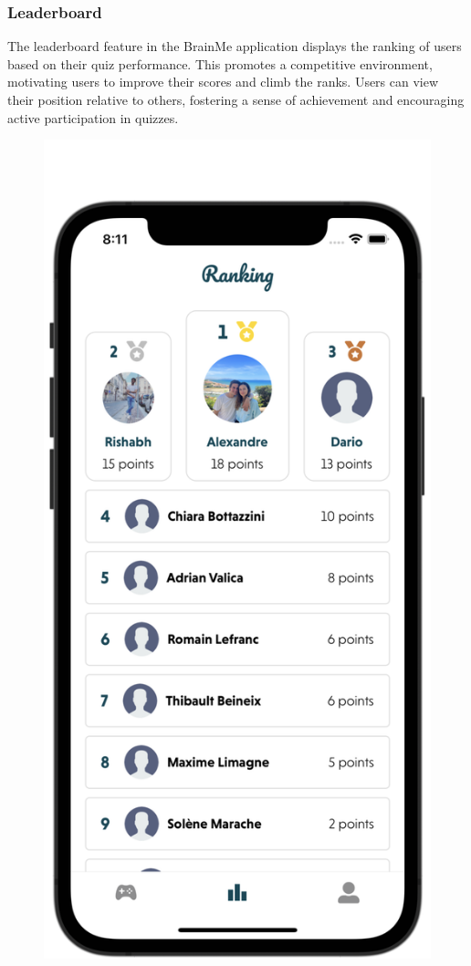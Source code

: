 \subsubsection{Leaderboard}

The leaderboard feature in the BrainMe application displays the ranking of users based on their quiz performance. This promotes a competitive environment, motivating users to improve their scores and climb the ranks. Users can view their position relative to others, fostering a sense of achievement and encouraging active participation in quizzes.

\begin{figure}[H]
    \centering
    \begin{minipage}[b]{0.3\linewidth}
        \centering
        \includegraphics[width=\linewidth]{Mobile UI/Initial Leaderboard.png}

\end{minipage}
\end{figure}
